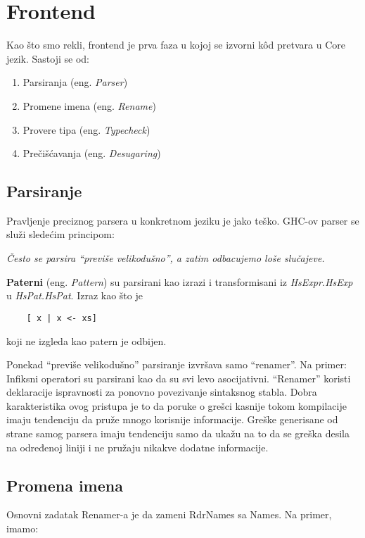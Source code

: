 \section{Frontend}
\label{sec:frontend}

Kao što smo rekli, frontend je prva faza u kojoj se izvorni k\^{o}d pretvara u Core jezik. Sastoji se od:
	 \begin{enumerate}
	 	\item Parsiranja (eng. \emph{Parser})
	 	\item Promene imena (eng. \emph{Rename}) 
	 	\item Provere tipa (eng. \emph{Typecheck})
	 	\item Prečišćavanja (eng. \emph{Desugaring})
	 \end{enumerate} 


\subsection{Parsiranje}
\label{subsec:podnaslovParse}

Pravljenje preciznog parsera u konkretnom jeziku je jako teško. GHC-ov parser se služi sledećim principom: 

\textit{Često se parsira “previše velikodušno”,  a zatim odbacujemo loše slučajeve.}

\textbf{Paterni} (eng. \emph{Pattern}) su parsirani kao izrazi i transformisani iz \textit{HsExpr.HsExp} u \textit{HsPat.HsPat}. Izraz kao što je
\begin{verbatim}
	[ x | x <- xs]
\end{verbatim}  
koji ne izgleda kao patern je odbijen.

Ponekad “previše velikodušno” parsiranje izvršava samo “renamer”. Na primer:
Infiksni operatori  su parsirani kao da su svi levo asocijativni. “Renamer” koristi deklaracije ispravnosti za ponovno povezivanje sintaksnog stabla. Dobra karakteristika ovog pristupa je to da poruke o grešci kasnije  tokom kompilacije imaju tendenciju da pruže mnogo korisnije informacije. Greške generisane od strane samog parsera imaju tendenciju samo da ukažu na to da se greška desila na određenoj liniji i ne pružaju nikakve dodatne informacije.

\subsection{Promena imena}
\label{subsec:podnaslovRename}

Osnovni zadatak Renamer-a je da zameni RdrNames sa Names. Na primer, imamo:

